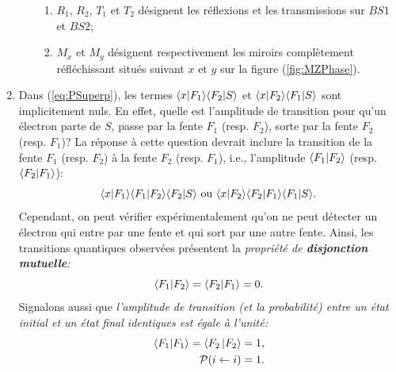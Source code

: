 \begin{enumerate}
\begin{itemize}
\begin{enumerate}
\item $R_1$, $R_2$, $T_1$ et $T_2$ désignent les réflexions et les
transmissions sur $BS1$ et $BS2$;

\item $M_{x}$ et $M_{y}$ désignent respectivement les miroirs complètement
réfléchissant situés suivant $x$ et $y$ sur la figure (\ref{fig:MZPhase}).
\end{enumerate}
\end{itemize}

\item Dans (\ref{eq:PSuperp}), les termes $\langle x\vert F_1\rangle\langle F_2
\vert S\rangle$ et $\langle x\vert F_2\rangle \langle F_1\vert S\rangle $ sont implicitement
nuls. En effet, quelle est l'amplitude de transition pour qu'un électron parte
de $S$, passe par la fente $F_1$ (resp. $F_2$), sorte par la fente $F_2$
(resp. $F_1$)? La réponse à cette question devrait inclure la transition de
la fente $F_1$ (resp. $F_2$) à la fente $F_2$ (resp. $F_1$), i.e.,
l'amplitude $\langle F_1\vert F_2\rangle $ (resp.$\langle F_2\vert F_1\rangle $):%
\begin{equation}
\langle x\vert F_1\rangle \langle F_1\vert F_2\rangle \langle F_2\vert S\rangle \text{ ou
}\langle x\vert F_2\rangle \langle F_2\vert F_1\rangle \langle F_1\vert S\rangle .
\end{equation}
Cependant, on peut vérifier expérimentalement qu'on ne peut détecter un
électron qui entre par une fente et qui sort par une autre fente. Ainsi, les
transitions quantiques observées présentent la \emph{propriété de
\textbf{disjonction mutuelle}:}%
\begin{equation}
\langle F_1\vert F_2\rangle =\langle F_2\vert F_1\rangle =0.
\end{equation}
Signalons aussi que \emph{l'amplitude de transition (et la probabilité) entre
un état initial et un état final identiques est égale à l'unité:}%
\begin{subequations}%
\begin{align}
\langle F_1\vert F_1\rangle =\langle F_2\left\vert
F_2\right\rangle =1,\\
\mathcal{P}(i\leftarrow i)=1.
\end{align}%
\end{subequations}%


\end{enumerate}
